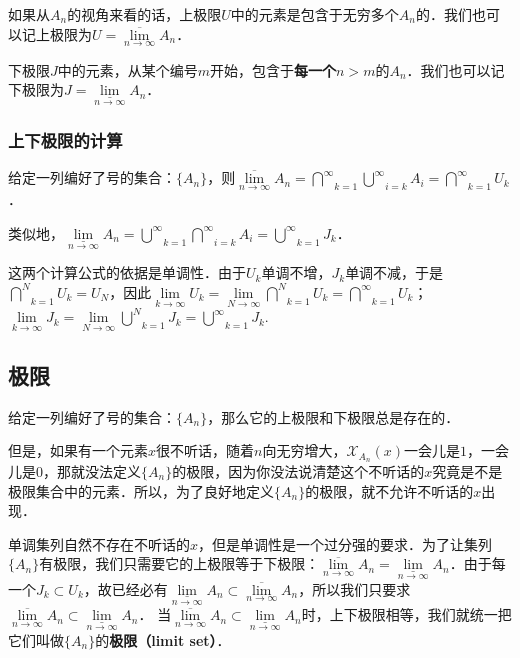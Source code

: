 如果从$A_n$的视角来看的话，上极限$U$中的元素是包含于无穷多个$A_n$的．我们也可以记上极限为$U=\overline{\lim}\limits_{n\rightarrow \infty}A_n$．

下极限$J$中的元素，从某个编号$m$开始，包含于\textbf{每一个}$n>m$的$A_n$．我们也可以记下极限为$J=\underline{\lim}\limits_{n\rightarrow \infty}A_n$．

\subsubsection{上下极限的计算}
给定一列编好了号的集合：$\{A_n\}$，则$\overline{\lim}\limits_{n\rightarrow \infty}A_n=\overset{\infty}\bigcap\limits_{k=1}\overset{\infty}\bigcup\limits_{i=k}A_i=\overset{\infty}\bigcap\limits_{k=1}U_k$．

类似地，$\underline{\lim}\limits_{n\rightarrow \infty}A_n=\overset{\infty}\bigcup\limits_{k=1}\overset{\infty}\bigcap\limits_{i=k}A_i=\overset{\infty}\bigcup\limits_{k=1}J_k$．

这两个计算公式的依据是单调性．由于$U_k$单调不增，$J_k$单调不减，于是$\overset{N}\bigcap\limits_{k=1}U_k=U_N$，因此$\lim\limits_{k\rightarrow\infty}U_k=\lim\limits_{N\rightarrow\infty}\overset{N}\bigcap\limits_{k=1}U_k=\overset{\infty}\bigcap\limits_{k=1}U_k$；$\lim\limits_{k\rightarrow\infty}J_k=\lim\limits_{N\rightarrow\infty}\overset{N}\bigcup\limits_{k=1}J_k=\overset{\infty}\bigcup\limits_{k=1}J_k$.

\subsection{极限}
给定一列编好了号的集合：$\{A_n\}$，那么它的上极限和下极限总是存在的．

但是，如果有一个元素$x$很不听话，随着$n$向无穷增大，$\mathcal{X}_{A_n}(x)$一会儿是$1$，一会儿是$0$，那就没法定义$\{A_n\}$的极限，因为你没法说清楚这个不听话的$x$究竟是不是极限集合中的元素．所以，为了良好地定义$\{A_n\}$的极限，就不允许不听话的$x$出现．

单调集列自然不存在不听话的$x$，但是单调性是一个过分强的要求．为了让集列$\{A_n\}$有极限，我们只需要它的上极限等于下极限：$\overline{\lim}\limits_{n\rightarrow \infty}A_n=\underline{\lim}\limits_{n\rightarrow \infty}A_n$．由于每一个$J_k\subset U_k$，故已经必有$\underline{\lim}\limits_{n\rightarrow \infty}A_n\subset\overline{\lim}\limits_{n\rightarrow \infty}A_n$，所以我们只要求$\overline{\lim}\limits_{n\rightarrow \infty}A_n\subset\underline{\lim}\limits_{n\rightarrow \infty}A_n$．
当$\overline{\lim}\limits_{n\rightarrow \infty}A_n\subset\underline{\lim}\limits_{n\rightarrow \infty}A_n$时，上下极限相等，我们就统一把它们叫做$\{A_n\}$的\textbf{极限（limit set）}．


